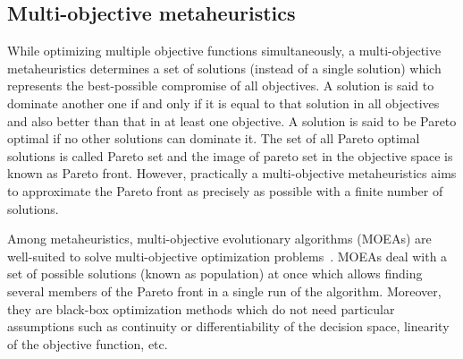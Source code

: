 

\subsection{Multi-objective metaheuristics}
\label{sec:mop}
While optimizing multiple objective functions simultaneously, a multi-objective metaheuristics determines a set of solutions (instead of a single solution) which represents the best-possible compromise of all objectives. A solution is said to dominate another one if and only if it is equal to that solution in all objectives and also better than that in at least one objective. A solution is said to be Pareto optimal if no other solutions can dominate it. The set of all Pareto optimal solutions is called Pareto set and the image of pareto set in the objective space is known as Pareto front. However, practically a multi-objective metaheuristics aims to approximate the Pareto front as precisely as possible with a finite number of solutions.

Among metaheuristics, multi-objective evolutionary algorithms (MOEAs) are well-suited to solve multi-objective optimization problems~\cite{yang2013grid}. MOEAs deal with a set of possible solutions (known as population) at once which allows finding several members of the Pareto front in a single run of the algorithm. Moreover, they are  black-box optimization methods which do not need particular assumptions such as continuity or differentiability of the decision space, linearity of the objective function, etc. 


